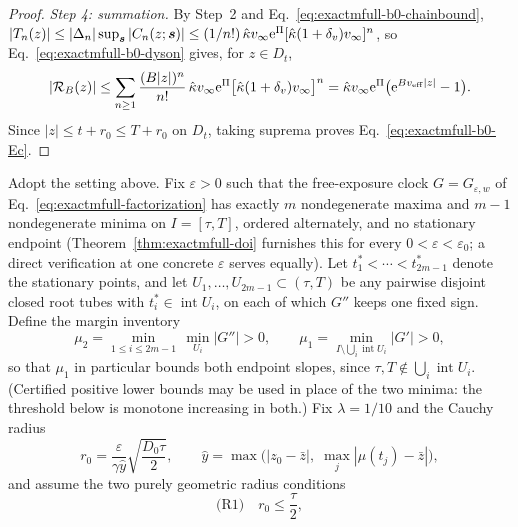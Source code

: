 \begin{proof}
\emph{Step 4: summation.}
By Step~2 and Eq.~\eqref{eq:exactmfull-b0-chainbound},
\(|T_n(z)|\le|\Delta_n|\sup_{\bm s}|C_n(z;\bm s)|
\le(1/n!)\,\hat\kappa v_\infty\mathrm e^{\Pi}
[\hat\kappa(1+\delta_v)v_\infty]^n\), so
Eq.~\eqref{eq:exactmfull-b0-dyson} gives, for
\(z\in D_t\),
\begin{equation*}
 |\mathcal R_B(z)|
 \le\sum_{n\ge1}\frac{(B|z|)^n}{n!}\,
 \hat\kappa v_\infty\mathrm e^{\Pi}
 \bigl[\hat\kappa(1+\delta_v)v_\infty\bigr]^n
 =\hat\kappa v_\infty\mathrm e^{\Pi}
 \bigl(\mathrm e^{Bv_{\rm eff}|z|}-1\bigr).
\end{equation*}
Since \(|z|\le t+r_0\le T+r_0\) on \(D_t\), taking suprema proves
Eq.~\eqref{eq:exactmfull-b0-Ec}.
\end{proof}

\begin{proposition}
\label{prop:exactmfull-b0}
Adopt the setting above.  Fix \(\varepsilon>0\) such that the free-exposure
clock \(G=G_{\varepsilon,w}\) of
Eq.~\eqref{eq:exactmfull-factorization} has exactly \(m\) nondegenerate
maxima and \(m-1\) nondegenerate minima on \(I=[\tau,T]\), ordered
alternately, and no stationary endpoint
(Theorem~\ref{thm:exactmfull-doi} furnishes this for every
\(0<\varepsilon<\varepsilon_0\); a direct verification at one concrete
\(\varepsilon\) serves equally).  Let \(t_1^*<\cdots<t_{2m-1}^*\) denote
the stationary points, and let
\(U_1,\ldots,U_{2m-1}\subset(\tau,T)\) be any pairwise disjoint closed
root tubes with \(t_i^*\in\operatorname{int}U_i\), on each of which
\(G''\) keeps one fixed sign.  Define the margin inventory
\begin{equation}
 \mu_2=\min_{1\le i\le2m-1}\,\min_{U_i}|G''|>0,
 \qquad
 \mu_1=\min_{I\setminus\bigcup_i\operatorname{int}U_i}|G'|>0,
 \label{eq:exactmfull-b0-margins}
\end{equation}
so that \(\mu_1\) in particular bounds both endpoint slopes, since
\(\tau,T\notin\bigcup_i\operatorname{int}U_i\).  (Certified positive lower
bounds may be used in place of the two minima: the threshold below is
monotone increasing in both.)  Fix \(\lambda=1/10\) and the Cauchy radius
\begin{equation}
 r_0=\frac{\varepsilon}{\gamma\hat y}
 \sqrt{\frac{D_0\tau}{2}},
 \qquad
 \hat y=\max\bigl(|z_0-\bar z|,\;\max_j|\mu(t_j)-\bar z|\bigr),
 \label{eq:exactmfull-b0-r0}
\end{equation}
and assume the two purely geometric radius conditions
\begin{equation}
 \text{(R1)}\quad r_0\le\frac\tau2,

\end{equation}
\end{proposition}
